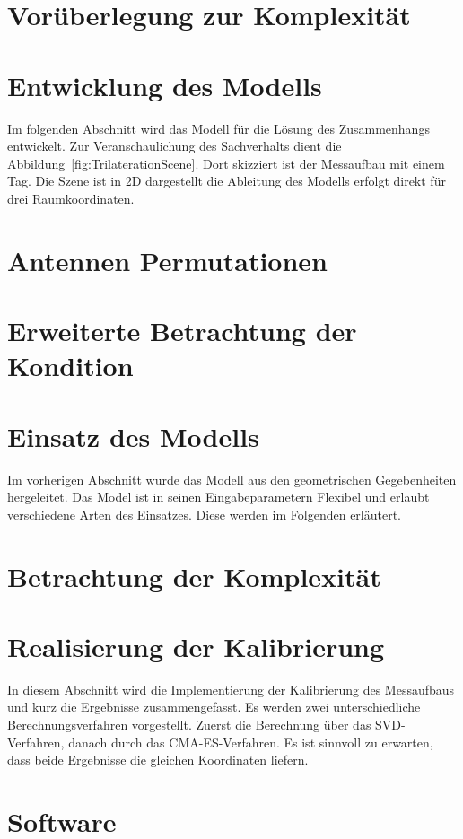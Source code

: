 \section{Vorüberlegung zur Komplexität}
\label{sec:Komplexity1}

%
\section{Entwicklung des Modells}
\label{sec:model_developement}
Im folgenden Abschnitt wird das Modell für die Lösung des Zusammenhangs entwickelt. Zur Veranschaulichung des Sachverhalts dient die Abbildung~\ref{fig:TrilaterationScene}. Dort skizziert ist der Messaufbau mit einem Tag. Die Szene ist in 2D dargestellt die Ableitung des Modells erfolgt direkt für drei Raumkoordinaten.
%

%
\section{Antennen Permutationen}

%
\section{Erweiterte Betrachtung der Kondition}
%

%
\section{Einsatz des Modells}
\label{sec:use_of_model}
Im vorherigen Abschnitt wurde das Modell aus den geometrischen Gegebenheiten hergeleitet. Das Model ist in seinen Eingabeparametern Flexibel und erlaubt verschiedene Arten des Einsatzes. Diese werden im Folgenden erläutert.
%

%
\section{Betrachtung der Komplexität}
\label{sec:Komplexity2}

%
\section{Realisierung der Kalibrierung}
\label{sec:calibration}
In diesem Abschnitt wird die Implementierung der Kalibrierung des Messaufbaus und kurz die Ergebnisse zusammengefasst. Es werden zwei unterschiedliche Berechnungsverfahren vorgestellt. Zuerst die Berechnung über das SVD-Verfahren, danach durch das CMA-ES-Verfahren. Es ist sinnvoll zu erwarten, dass beide Ergebnisse die gleichen Koordinaten liefern.
%

%
\section{Software}
\label{sec:sw}

